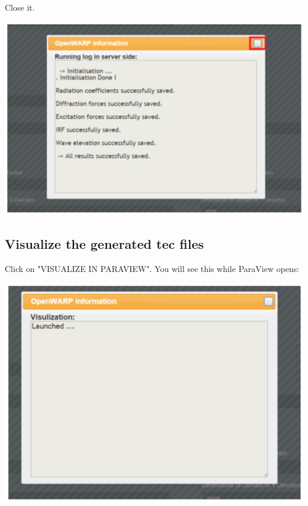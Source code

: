 \documentclass[12pt]{article}
\begin{document}
Close it.

\vspace{\abovedisplayskip}
\begin{minipage}{\linewidth}
	\centering
	\includegraphics[scale=0.5]{img/54}
\end{minipage}
\vspace{\belowdisplayskip}




\subsection{Visualize the generated tec files}

Click on "VISUALIZE IN PARAVIEW".
You will see this while ParaView opens:

\vspace{\abovedisplayskip}
\begin{minipage}{\linewidth}
	\centering
	\includegraphics[scale=0.5]{img/55}
\end{minipage}
\vspace{\belowdisplayskip}
\end{document}
